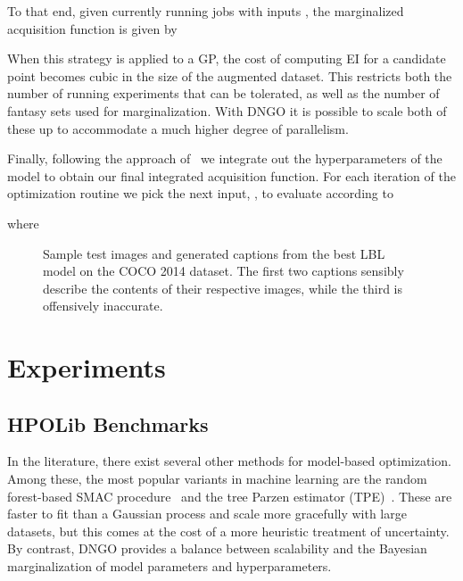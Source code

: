\documentclass{article}
\begin{document}
To that end, given currently running jobs with inputs , the marginalized acquisition function  is given by


When this strategy is applied to a GP, the cost of computing EI for a candidate point becomes cubic in the size of the augmented dataset. This restricts both the number of running experiments that can be tolerated, as well as the number of fantasy sets used for marginalization. With DNGO it is possible to scale both of these up to accommodate a much higher degree of parallelism. 

Finally, following the approach of~\citet{snoek-etal-2012b} we integrate out the hyperparameters of the model to obtain our final integrated acquisition function.  For each iteration of the optimization routine we pick the next input, , to evaluate according to

where
\vspace{-9pt}


\begin{figure*}[t]
\centering {}\hfill
{}\hfill
{}
\vspace{-9pt}
\caption{Sample test images and generated captions from the best LBL model on the COCO 2014 dataset. The first two captions sensibly describe the contents of their respective images, while the third is offensively inaccurate.}
\label{fig:captions}
\end{figure*}

\section{Experiments}
\label{sec:empirical}
\subsection{HPOLib Benchmarks}
In the literature, there exist several other methods for model-based optimization. Among these, the most popular variants in machine learning are the random forest-based SMAC procedure~\cite{hutter-2011a} and the tree Parzen estimator (TPE)~\cite{BergstraJ2011}. These are faster to fit than a Gaussian process and scale more gracefully with large datasets, but this comes at the cost of a more heuristic treatment of uncertainty. By contrast, DNGO provides a balance between scalability and the Bayesian marginalization of model parameters and hyperparameters.
\end{document}
